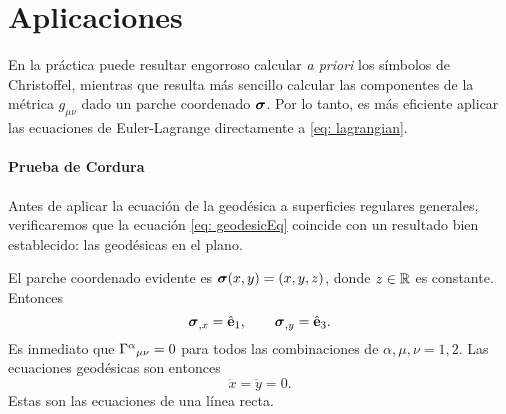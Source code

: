 \section{Aplicaciones}
En la práctica puede resultar engorroso calcular \textit{a priori} los símbolos de Christoffel, mientras que resulta más sencillo calcular las componentes de la métrica $g_{\mu\nu}$ dado un parche coordenado $\boldsymbol{\sigma}$. Por lo tanto, es más eficiente aplicar las ecuaciones de Euler-Lagrange directamente a \eqref{eq: lagrangian}.

\paragraph{Prueba de Cordura}
Antes de aplicar la ecuación de la geodésica a superficies regulares generales, verificaremos que la ecuación \eqref{eq: geodesicEq} coincide con un resultado bien establecido: las geodésicas en el plano.

El parche coordenado evidente es $\boldsymbol{\sigma}(x, y) = (x, y, z)$, donde $z \in \mathbb R$ es constante. Entonces
\begin{equation}
	\boldsymbol{\sigma}_{,x} = \hat{\mathbf{e}}_{1}, \qquad \boldsymbol{\sigma}_{,y} = \hat{\mathbf{e}}_{3}.
\end{equation}
Es inmediato que ${\Gamma^{\alpha}}_{\mu\nu} = 0$ para todos las combinaciones de $\alpha, \mu,\nu = 1, 2$.
Las ecuaciones geodésicas son entonces
\begin{equation}
	\ddot x = \ddot y = 0.
\end{equation}
Estas son las ecuaciones de una línea recta.


